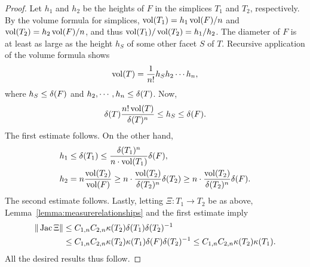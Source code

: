 \documentclass[10pt,letterpaper]{article}
\begin{document}


\begin{proof}
    Let $h_1$ and $h_2$ be the heights of $F$ in the simplices $T_1$ and $T_2$, respectively. 
    By the volume formula for simplices, $\operatorname{vol}(T_1) = h_1 \operatorname{vol}(F)/n$ and $\operatorname{vol}(T_2) = h_2 \operatorname{vol}(F)/n$, and thus $\operatorname{vol}(T_1)/\operatorname{vol}(T_2) = h_1/h_2$.
    The diameter of $F$ is at least as large as the height $h_S$ of some other facet $S$ of $T$. Recursive application of the volume formula shows 
    \begin{align*}
        \operatorname{vol}(T) = \frac{1}{n!} h_S h_2 \cdots h_n,
    \end{align*}
    where $h_S \leq {\delta}(F)$ and $h_2, \cdots, h_n \leq {\delta}(T)$. Now, 
    \begin{align*}
        {\delta}(T) \frac{ n! \operatorname{vol}(T) }{ {\delta}(T)^{n} } \leq h_S \leq {\delta}(F).
    \end{align*}
    The first estimate follows. 
    On the other hand, 
    \begin{align*}
        h_1 &\leq {\delta}(T_1) \leq \frac{{\delta}(T_1)^{n}}{n \cdot \operatorname{vol}(T_1)} {\delta}(F),
        \\
        h_2 &= n \frac{\operatorname{vol}(T_2)}{\operatorname{vol}(F)} \geq n \cdot \frac{\operatorname{vol}(T_2)}{{\delta}(T_2)^{n}} {\delta}(T_2) \geq n \cdot \frac{\operatorname{vol}(T_2)}{{\delta}(T_2)^{n}} {\delta}(F)
        .
    \end{align*}
    The second estimate follows. 
    Lastly, letting $\Xi : T_1 \rightarrow T_2$ be as above, Lemma~\ref{lemma:measurerelationships} and the first estimate imply 
    \begin{align*}
        \| \operatorname{{\rm Jac}} \Xi \|
        &
        \leq 
        C_{1,n}
        C_{2,n}
        \kappa(T_2)
        {\delta}(T_1)
        {\delta}(T_2)^{-1}
        \\&
        \leq 
        C_{1,n}
        C_{2,n}
        \kappa(T_2)
        \kappa(T_1) 
        {\delta}(F)
        {\delta}(T_2)^{-1}
        \leq 
        C_{1,n}
        C_{2,n}
        \kappa(T_2)
        \kappa(T_1) 
        .
    \end{align*}
    All the desired results thus follow.
    

\end{proof}
\end{document}
